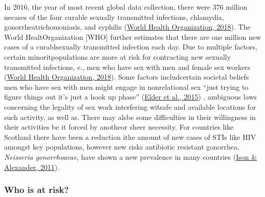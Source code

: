 \documentclass[
  donotrepeattitle,doc, 12pt, a4paper,floatsintext]{apa7}
\begin{document}
In 2016, the year of most recent global data collection, there were 376 million necases of the four curable sexually transmitted infections, chlamydia, gonorrheatrichomoniasis, and syphilis (\protect\hyperlink{ref-worldhealthorganization2018}{World Health Organization, 2018}). The World HealtOrganization {[}WHO{]} further estimates that there are one million new cases of a curablsexually transmitted infection each day. Due to multiple factors, certain minoritpopulations are more at risk for contracting new sexually transmitted infections, e., men who have sex with men and female sex workers (\protect\hyperlink{ref-worldhealthorganization2018}{World Health Organization, 2018}). Some factors includcertain societal beliefs men who have sex with men might engage in nonrelational sex ``just trying to figure things out it's just a hook up phase'' (\protect\hyperlink{ref-elder2015a}{Elder et al., 2015}) , ambiguous laws concerning the legality of sex work interfering witsafe and available locations for such activity, as well as. There may alsbe some difficulties in their willingness in their activities be it forced by anotheor sheer necessity. For countries like Scotland there have been a reduction ithe amount of new cases of STIs like HIV amongst key populations, however new risks antibiotic resistant gonorrhea, \emph{Neisseria gonorrhoaeae}, have shown a new prevalence in many countries (\protect\hyperlink{ref-ison2011}{Ison \& Alexander, 2011}).

\hypertarget{who-is-at-risk}{%
\subsubsection{Who is at risk?}\label{who-is-at-risk}}
\end{document}
